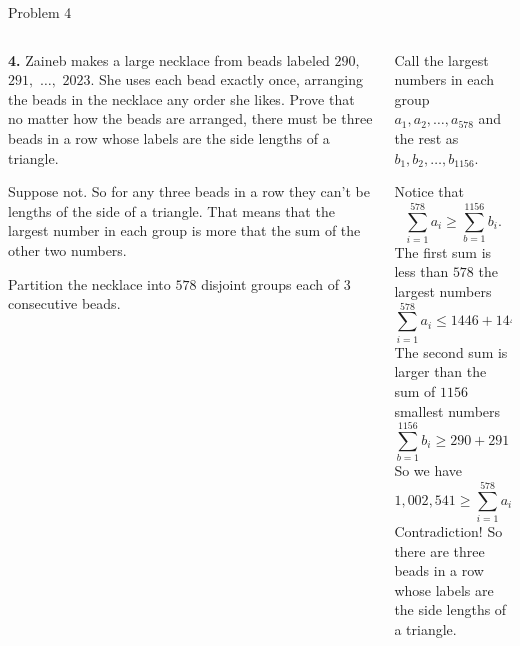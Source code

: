 \documentclass[9pt,aspectratio=169]{beamer}
\begin{document}
\begin{frame}{Problem 4}
  \begin{columns}[T]
    \begin{column}{0.5\textwidth}
      \begin{problem}
        \textbf{4.} Zaineb makes a large necklace from beads labeled $290,$ $291,$ $\ldots,$ $2023$. She uses each bead exactly once, arranging the beads in the necklace any order she likes. Prove that no matter how the beads are arranged, there must be three beads in a row whose labels are the side lengths of a triangle.
      \end{problem}
      \pause

      Suppose not. So for any three beads in a row they can't be lengths of the side of a triangle. That means that the largest number in each group is more that the sum of the other two numbers.
      \pause

      Partition the necklace into $578$ disjoint groups each of $3$ consecutive beads.
      \pause
    \end{column}
    \begin{column}{0.5\textwidth}

      Call the largest numbers in each group $a_1, a_2, \ldots, a_{578}$ and the rest as $b_1, b_2, \ldots, b_{1156}$. 
      \pause

      Notice that 
      \[ \sum_{i=1}^{578} a_i \ge \sum_{b=1}^{1156} b_i. \] 
      \pause
      The first sum is less than $578$ the largest numbers
      \[ \sum_{i=1}^{578} a_i \leq 1446 + 1447 + \ldots + 2023 = 1{,}002{,}541. \]
      \pause
      The second sum is larger than the sum of $1156$ smallest numbers
      \[ \sum_{b=1}^{1156} b_i \geq 290 + 291 + \ldots + 1445 = 1{,}002{,}830. \]
      \pause
      So we have \[1{,}002{,}541 \ge \sum_{i=1}^{578} a_i \ge \sum_{b=1}^{1156} b_i \ge 1{,}002{,}830.\]
      \pause
      Contradiction! So there are three beads in a row whose labels are the side lengths of a triangle.
    \end{column}
  \end{columns}
\end{frame}
\end{document}
